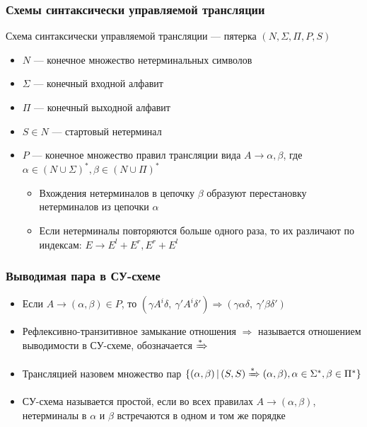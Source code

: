 \documentclass{beamer}
\newcommand{\derive}[0]{\xRightarrow[]{*}}
\begin{document}
\begin{frame}[fragile]
  \transwipe[direction=90]
  \frametitle{Схемы синтаксически управляемой трансляции}

\begin{center}
    Схема синтаксически управляемой трансляции --- пятерка $(N, \Sigma, \Pi, P, S)$
\end{center}

  \begin{itemize}
    \item $N$ --- конечное множество нетерминальных символов
    \item $\Sigma$ --- конечный входной алфавит
    \item $\Pi$ --- конечный выходной алфавит
    \item $S \in N$ --- стартовый нетерминал
    \item $P$ --- конечное множество правил трансляции вида $A \rightarrow \alpha, \beta$, где $\alpha \in (N \cup \Sigma)^*, \beta \in (N \cup \Pi)^*$
    \begin{itemize}
      \item Вхождения нетерминалов в цепочку $\beta$ образуют перестановку нетерминалов из цепочки $\alpha$
      \item Если нетерминалы повторяются больше одного раза, то их различают по индексам: $E \rightarrow E^l + E^r, E^r + E^l$
    \end{itemize}
  \end{itemize}
\end{frame}

\begin{frame}[fragile]
  \transwipe[direction=90]
  \frametitle{Выводимая пара в СУ-схеме}
  \begin{itemize}
    \item Если $A \rightarrow (\alpha, \beta) \in P$, то $(\gamma A^i \delta, \ \gamma' A^i \delta') \Rightarrow (\gamma \alpha \delta, \ \gamma' \beta \delta')$
    \item Рефлексивно-транзитивное замыкание отношения $\Rightarrow$ называется отношением выводимости в СУ-схеме, обозначается $\xRightarrow[]{*}$
    \item Трансляцией назовем множество пар $\{ (\alpha, \beta) \, | \, (S, S) \derive (\alpha, \beta), \alpha \in \Sigma^*, \beta \in \Pi^* \}$
    \item СУ-схема называется простой, если во всех правилах $A \rightarrow (\alpha, \beta)$, нетерминалы в $\alpha$ и $\beta$ встречаются в одном и том же порядке
  \end{itemize}
\end{frame}
\end{document}
